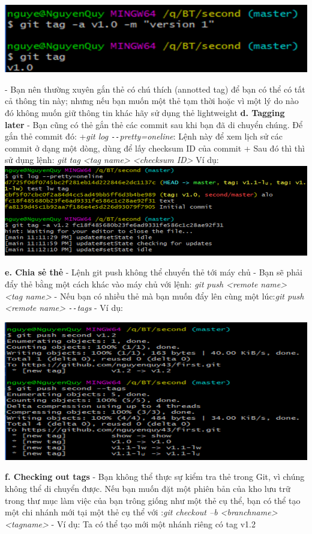 \documentclass[12pt,a4paper]{report}
\begin{document}
	\includegraphics[width=0.8\linewidth]{screenshot043}

	\label{fig:screenshot043}\vskip 0.4cm\vskip 0.4cm

- Bạn nên thường xuyên gắn thẻ có chú thích (annotted tag) để bạn có thể có tất cả thông tin này; nhưng nếu bạn muốn một thẻ tạm thời hoặc vì một lý do nào đó không muốn giữ thông tin khác hãy sử dụng thẻ lightweight\vskip 0.4cm
{\bf d. Tagging later} \vskip 0.4cm
- Bạn cũng có thẻ gắn thẻ các commit sau khi bạn đã di chuyển chúng. Để gắn thẻ commit đó: \vskip 0.4cm
+{\it git log \texttt{-{}-}pretty=oneline}: Lệnh này để xem lịch sử các commit ở dạng một dòng, dùng để lấy checksum ID của commit\vskip 0.4cm
+ Sau đó thì thì sử dụng lệnh: {\it git tag  <tag name> <checksum ID>}\vskip 0.4cm
Ví dụ: 
\vskip 0.4cm
	\includegraphics[width=0.8\linewidth]{screenshot044}

	\label{fig:screenshot044}
\vskip 0.4cm\vskip 0.4cm
{\bf e. Chia sẻ thẻ} \vskip 0.4cm
- Lệnh git push không thể chuyển thẻ tới máy chủ\vskip 0.4cm
- Bạn sẽ phải đẩy thẻ bằng một cách khác vào máy chủ với lệnh: {\it git push <remote name> <tag name>}\vskip 0.4cm
- Nếu bạn có nhiều thẻ mà bạn muốn đẩy lên cùng một lúc:{\it git push <remote name> \texttt{-{}-}tags}\vskip 0.4cm
- Ví dụ:\vskip 0.4cm

	\includegraphics[width=0.8\linewidth]{screenshot045}

	\label{fig:screenshot045}
\vskip 0.4cm\vskip 0.4cm
{\bf f. Checking out tags} \vskip 0.4cm
- Bạn không thể thực sự kiểm tra thẻ trong Git, vì chúng không thể di chuyển được. Nếu bạn muốn đặt một phiên bản của kho lưu trữ trong thư mục làm việc của bạn trông giống như một thẻ cụ thể, bạn có thể tạo một chi nhánh mới tại một thẻ cụ thể với :{\it git checkout –b <branchname> <tagname>}\vskip 0.4cm
- Ví dụ: Ta có thể tạo mới một nhánh riêng có tag v1.2\vskip 0.4cm
\end{document}
